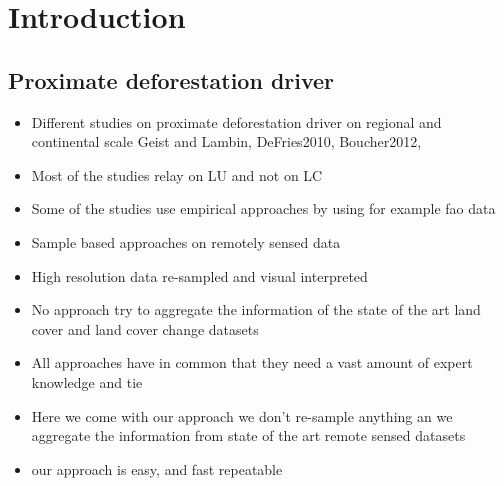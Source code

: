 \chapter{Introduction}
\label{ch:introduction}

	\section{Proximate deforestation driver}
	\label{sec:tropical_forest}


	\begin{itemize}
		\item Different studies on proximate deforestation driver on regional and continental scale \citep{Curtis2018,Hosonuma2012,Sy2015,Austin2019,Zalles2018,Carter2018,Ickowitz2015,Meyfroidt2013}Geist and Lambin, DeFries2010, Boucher2012, 
		\item Most of the studies relay on \ac{LU} and not on \ac{LC}
		\item Some of the studies use empirical approaches by using for example fao data \citep{Hosonuma2012}
		\item Sample based approaches on remotely sensed data \citep{Austin2019,Sy2015}
		\item High resolution data re-sampled and visual interpreted \citep{Curtis2018}
		\item No approach try to aggregate the information of the state of the art land cover and land cover change datasets
		\item All approaches have in common that they need a vast amount of expert knowledge and tie
		\item Here we come with our approach we don't re-sample anything an we aggregate the information from state of the art remote sensed datasets
		\item our approach is easy, and fast repeatable
	\end{itemize}


